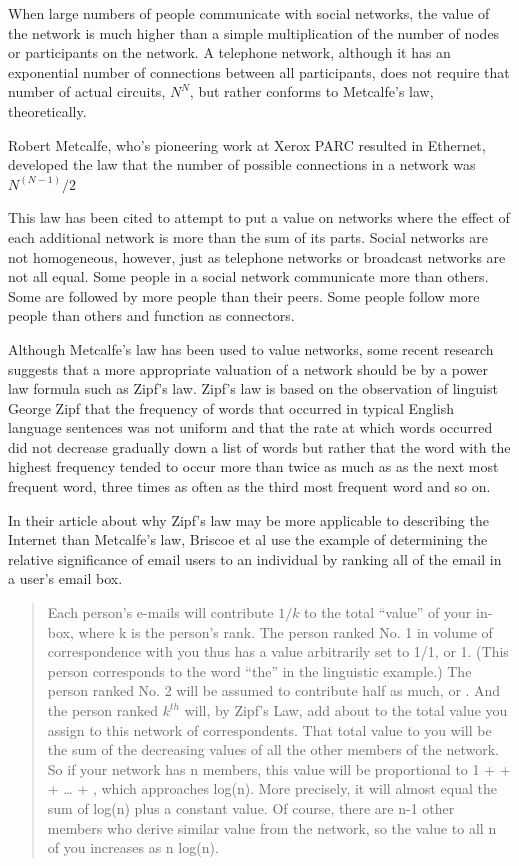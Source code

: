 When large numbers of people communicate with social networks, the value of the network is much higher than a simple multiplication of the number of nodes or participants on the network. A telephone network, although it has an exponential number of connections between all participants, does not require that number of actual circuits, $N^{N}$, but rather conforms to Metcalfe's law, theoretically.

Robert Metcalfe, who's pioneering work at Xerox PARC resulted in Ethernet, developed the law that the number of possible connections in a network was $N^{(N-1)}/2$

This law has been cited to attempt to put a value on networks where the effect of each additional network is more than the sum of its parts. Social networks are not homogeneous, however, just as telephone networks or broadcast networks are not all equal. Some people in a social network communicate more than others. Some are followed by more people than their peers. Some people follow more people than others and function as connectors. 

Although Metcalfe's law has been used to value networks, some recent research suggests that a more appropriate valuation of a network should be by a power law formula such as Zipf's law. Zipf's law is based on the observation of linguist George Zipf that the frequency of words that occurred in typical English language sentences was not uniform and that the rate at which words occurred did not decrease gradually down a list of words but rather that the word with the highest frequency tended to occur more than twice as much as as the next most frequent word, three times as often as the third most frequent word and so on. 

In their article about why Zipf's law may be more applicable to describing the Internet than Metcalfe's law, Briscoe et al use the example of determining the relative significance of email users to an individual by ranking all of the email in a user's email box.

\begin{quotation}
Each person's e-mails will contribute $1/k$ to the
total ``value'' of your in-box, where k is the person's rank.
The person ranked No. 1 in volume of correspondence with
you thus has a value arbitrarily set to 1/1, or 1. (This person corresponds
to the word ``the'' in the linguistic example.) The person
ranked No. 2 will be assumed to contribute half as much, or \textonehalf.
And the person ranked $k^{th}$ will, by Zipf's Law, add about  to
the total value you assign to this network of correspondents.
That total value to you will be the sum of the decreasing 
values of all the other members of the network. So if your network
has n members, this value will be proportional to 1 + \textonehalf +  + \ldots
+ , which approaches log(n). More precisely, it will almost
equal the sum of log(n) plus a constant value. Of course, there are
n-1 other members who derive similar value from the network,
so the value to all n of you increases as n log(n)\cite{RefWorks:297}.
\end{quotation}  


